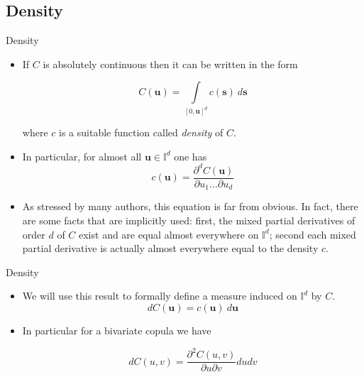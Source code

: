 \documentclass[11pt]{beamer}
\theoremstyle{plain}
\theoremstyle{definition}
\theoremstyle{remark}
\begin{document}
\subsection{Density}
%
\begin{frame}{Density}
   \begin{itemize}
      \item   				  						  
			If $C$ is absolutely continuous then it can be written in the form 
			
			\begin{equation}
			C(\mathbf{u}) = \int\limits_{[0, \mathbf{u}]^d} c(\mathbf{s}) \> d \mathbf{s}
			\end{equation}
			
			where $c$ is a suitable function called \textit{density} of $C$. 
	  \item 
	  		In particular, for almost all $\mathbf{u} \in \mathbb{I}^d$ one has
	  		\begin{equation}
				c(\mathbf{u}) = \frac{\partial^d C(\mathbf{u})}{\partial u_1 \dots \partial 
				u_d}
			\end{equation}
	  \item 
			As stressed by many authors, this equation is far from obvious. In fact, there 
			are some facts that are implicitly used: first, the mixed partial derivatives of 
			order $d$ of $C$ exist and are equal almost everywhere on $\mathbb{I}^d$; second 
			each mixed partial derivative is actually almost everywhere equal to the density 
			$c$. 
   \end{itemize}
\end{frame}
%
\begin{frame}{Density}
   \begin{itemize}
      \item   				  						  
		We will use this result to formally define a measure induced on $\mathbb{I}^d$ by $C
		$. 
		\begin{equation}
		dC(\mathbf{u}) = c(\mathbf{u}) \> d \mathbf{u}
		\end{equation}

	  \item 
			In particular for a bivariate copula we have
			
			\begin{equation}
			dC(u, v) = \frac{\partial^2 C(u, v)}{\partial u \partial v} du dv
			\end{equation}
   \end{itemize}
\end{frame}
\end{document}
